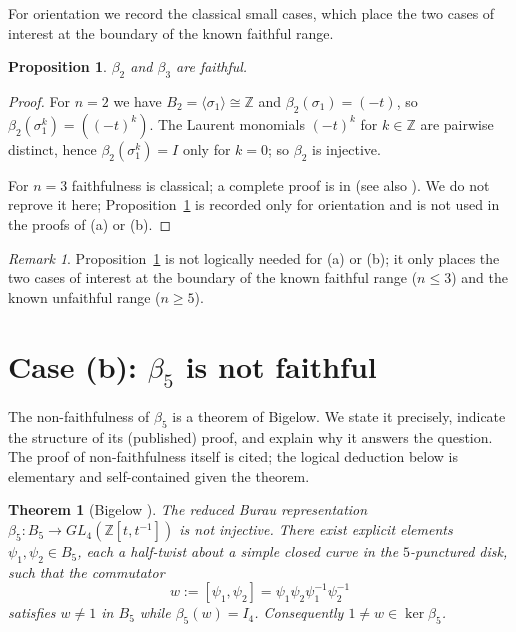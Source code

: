\documentclass{amsart}
\newtheorem{theorem}{Theorem}
\newtheorem{proposition}{Proposition}
\theoremstyle{remark}
\newtheorem{remark}{Remark}
\begin{document}
For orientation we record the classical small cases, which place the two cases
of interest at the boundary of the known faithful range.

\begin{proposition}\label{prop:small}
$\beta_2$ and $\beta_3$ are faithful.
\end{proposition}

\begin{proof}
For $n=2$ we have $B_2=\langle\sigma_1\rangle\cong\mathbb Z$ and
$\beta_2(\sigma_1)=(-t)$, so $\beta_2(\sigma_1^k)=((-t)^k)$. The Laurent
monomials $(-t)^k$ for $k\in\mathbb Z$ are pairwise distinct, hence
$\beta_2(\sigma_1^k)=I$ only for $k=0$; so $\beta_2$ is injective.

For $n=3$ faithfulness is classical; a complete proof is in
\cite[Theorem~3.15 and \S3.3]{KasselTuraev} (see also \cite{Birman}). We do not
reprove it here; Proposition~\ref{prop:small} is recorded only for orientation
and is not used in the proofs of (a) or (b).
\end{proof}

\begin{remark}
Proposition~\ref{prop:small} is not logically needed for (a) or (b); it only
places the two cases of interest at the boundary of the known faithful range
($n\le3$) and the known unfaithful range ($n\ge5$).
\end{remark}

\section{Case (b): $\beta_5$ is not faithful}

The non-faithfulness of $\beta_5$ is a theorem of Bigelow. We state it
precisely, indicate the structure of its (published) proof, and explain why it
answers the question. The proof of non-faithfulness itself is cited; the logical
deduction below is elementary and self-contained given the theorem.

\begin{theorem}[Bigelow {\cite[Theorem]{Bigelow1999}}]\label{thm:bigelow}
The reduced Burau representation $\beta_5:B_5\to GL_4(\mathbb Z[t,t^{-1}])$ is
not injective. There exist explicit elements $\psi_1,\psi_2\in B_5$, each a
half-twist about a simple closed curve in the $5$-punctured disk, such that the
commutator
\begin{equation}\label{eq:ker}
w:=[\psi_1,\psi_2]=\psi_1\psi_2\psi_1^{-1}\psi_2^{-1}
\end{equation}
satisfies $w\ne 1$ in $B_5$ while $\beta_5(w)=I_4$. Consequently
$1\ne w\in\ker\beta_5$.
\end{theorem}
\end{document}
